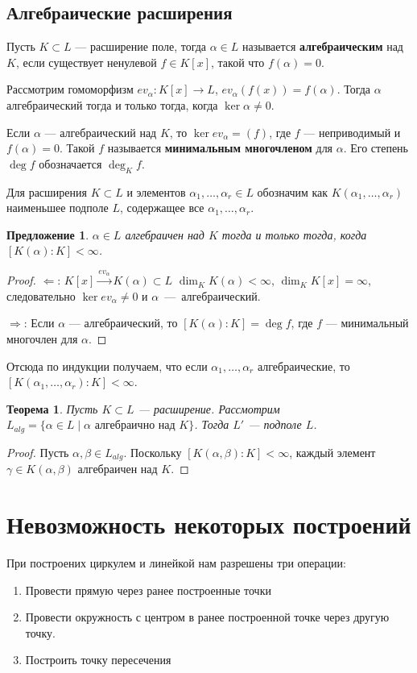 \documentclass[a4paper]{article}
\newtheorem{theorem}{Теорема}
\numberwithin{theorem}{section}
\numberwithin{lemma}{section}
\newtheorem{proposition}{Предложение}
\numberwithin{proposition}{section}
\numberwithin{corollary}{section}
\begin{document}
\subsection*{Алгебраические расширения}
Пусть $K \subset L$ --- расширение поле, тогда $\alpha \in L$
называется \textbf{алгебраическим} над $K$, если существует ненулевой
$f \in K[x]$, такой что $f(\alpha) = 0$.

Рассмотрим гомоморфизм $ev_\alpha: K[x] \to L$, $ev_\alpha(f(x)) = f(\alpha)$. Тогда $\alpha$ алгебраический тогда и только тогда,
когда $\ker \alpha \ne 0$.

Если $\alpha$ --- алгебраический над $K$, то $\ker ev_\alpha = (f)$,
где $f$ --- неприводимый и $f(\alpha) = 0$. Такой $f$ называется
\textbf{минимальным многочленом} для $\alpha$. Его степень $\deg f$ обозначается $\deg_K f$.

Для расширения $K \subset L$ и
элементов $\alpha_1, \dots, \alpha_r \in L$
обозначим как $K(\alpha_1, \dots, \alpha_r)$ наименьшее подполе $L$,
содержащее все $\alpha_1, \dots, \alpha_r$.

\begin{proposition}
$\alpha \in L$ алгебраичен над $K$ тогда и только тогда,
когда $[K(\alpha) : K] < \infty$.
\end{proposition}
\begin{proof}
$\Leftarrow$: $K[x] \xrightarrow{ev_\alpha} K(\alpha) \subset L$
$\dim_K K(\alpha) < \infty$, $\dim_K K[x] = \infty$, следовательно
$\ker ev_\alpha \ne 0$ и $\alpha$~---~алгебраический.

$\Rightarrow$: Если $\alpha$ --- алгебраический, то $[K(\alpha) : K] = \deg f$, где $f$ --- минимальный многочлен для $\alpha$.
\end{proof}

Отсюда по индукции получаем, что если $\alpha_1, \dots, \alpha_r$ алгебраические, то $[K(\alpha_1, \dots, \alpha_r) : K] < \infty$.

\begin{theorem}
Пусть $K \subset L$ --- расширение.
Рассмотрим $L_{alg} = \{\alpha \in L \mid  \text{$\alpha$ алгебраично над $K$}\}$.
Тогда $L'$ --- подполе $L$.
\end{theorem}
\begin{proof}
Пусть $\alpha, \beta \in L_{alg}$.
Поскольку $[K(\alpha, \beta) : K] < \infty$, каждый элемент $\gamma \in K(\alpha, \beta)$ алгебраичен над $K$.
\end{proof}

\section{Невозможность некоторых построений}
При построених циркулем и линейкой нам разрешены три операции:
\begin{enumerate}
    \item Провести прямую через ранее построенные точки
    \item Провести окружность с центром в ранее построенной точке через другую точку.
    \item Построить точку пересечения
\end{enumerate}
\end{document}
